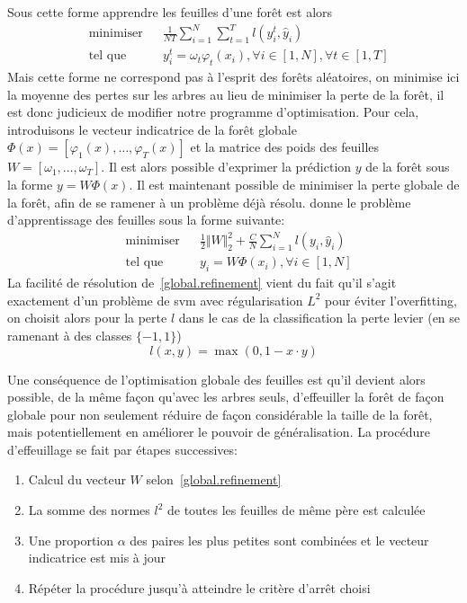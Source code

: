 Sous cette forme apprendre les feuilles d'une forêt est alors
\begin{equation*}
    \begin{aligned}
        & \text{minimiser}
        & & \frac{1}{N T} \sum_{i=1}^N \sum_{t=1}^T l(y_i^t , \hat{y}_i ) \\
        & \text{tel que} 
        & & y_i^t = \omega_t \varphi_t (x_i ) , \forall i \in [1,N], \forall t \in [1,T]
    \end{aligned}
\end{equation*}
Mais cette forme ne correspond pas à l'esprit des forêts aléatoires, on minimise ici la moyenne des pertes sur les arbres au lieu de minimiser la perte de la forêt, il est donc judicieux de modifier notre programme d'optimisation. Pour cela, introduisons le vecteur indicatrice de la forêt globale $\Phi (x) = [\varphi_1 (x), \dotsc, \varphi_T (x)]$ et la matrice des poids des feuilles $W = [\omega_1, \dotsc, \omega_T]$. Il est alors possible d'exprimer la prédiction $y$ de la forêt sous la forme $y = W \Phi (x)$. Il est maintenant possible de minimiser la perte globale de la forêt, afin de se ramener à un problème déjà résolu. \citet{Ren2015} donne le problème d'apprentissage des feuilles sous la forme suivante:
\begin{equation} \label{global.refinement}
    \begin{aligned}
        & \text{minimiser}
        & & \frac{1}{2} \Vert W \Vert^2_2 + \frac{C}{N} \sum_{i=1}^N l(y_i , \hat{y}_i ) \\
        & \text{tel que} 
        & & y_i = W \Phi (x_i ) , \forall i \in [1,N]
    \end{aligned}
\end{equation}
La facilité de résolution de~\ref{global.refinement} vient du fait qu'il s'agit exactement d'un problème de \ac{svm} avec régularisation $L^2$ pour éviter l'overfitting, on choisit alors pour la perte $l$ dans le cas de la classification la perte levier (en se ramenant à des classes $\{-1,1\}$)
\begin{equation*}
    l(x,y) = \max ( 0 , 1 - x \cdot y )
\end{equation*}

Une conséquence de l'optimisation globale des feuilles est qu'il devient alors possible, de la même façon qu'avec les arbres seuls, d'effeuiller la forêt de façon globale pour non seulement réduire de façon considérable la taille de la forêt, mais potentiellement en améliorer le pouvoir de généralisation. La procédure d'effeuillage se fait par étapes successives:
\begin{enumerate}
    \item Calcul du vecteur $W$ selon~\ref{global.refinement}
    \item La somme des normes $l^2$ de toutes les feuilles de même père est calculée
    \item Une proportion $\alpha$ des paires les plus petites sont combinées et le vecteur indicatrice est mis à jour
    \item Répéter la procédure jusqu'à atteindre le critère d'arrêt choisi
\end{enumerate}

